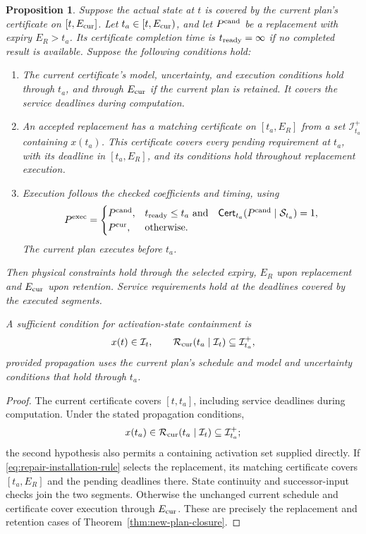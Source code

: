 \documentclass[preprint,12pt]{elsarticle}
\theoremstyle{definition}
\theoremstyle{plain}
\newtheorem{proposition}{Proposition}
\theoremstyle{definition}
\theoremstyle{plain}
\begin{document}
\begin{proposition}
\label{prop:repair-execution}
\label{prop:planned-handover}
Suppose the actual state at $t$ is covered by the current plan's
certificate on $[t,E_{\rm cur}]$. Let $t_a\in[t,E_{\rm cur})$, and let
$P^{\rm cand}$ be a replacement with expiry $E_R>t_a$. Its certificate
completion time is $t_{\rm ready}=\infty$ if no completed result is
available. Suppose the following conditions hold:
\begin{enumerate}
\item The current certificate's model, uncertainty, and execution
conditions hold through $t_a$, and through $E_{\rm cur}$ if the current
plan is retained. It covers the service deadlines during computation.
\item An accepted replacement has a matching certificate on $[t_a,E_R]$
from a set $\mathcal I_{t_a}^+$ containing $x(t_a)$. This certificate
covers every pending requirement at $t_a$, with its deadline in
$[t_a,E_R]$, and its conditions hold throughout replacement execution.
\item Execution follows the checked coefficients and timing, using
\begin{equation}
P^{\rm exec}=\begin{cases}
P^{\rm cand},&t_{\rm ready}\le t_a\ \text{and}\quad
 \mathsf{Cert}_{t_a}(P^{\rm cand}\mid\mathcal S_{t_a})=1,\\
P^{\rm cur},&\text{otherwise}.
\end{cases}
\label{eq:repair-installation-rule}
\end{equation}
The current plan executes before $t_a$.
\end{enumerate}
Then physical constraints hold through the selected expiry, $E_R$ upon
replacement and $E_{\rm cur}$ upon retention. Service requirements hold
at the deadlines covered by the executed segments.

A sufficient condition for activation-state containment is
\[
x(t)\in\mathcal I_t,\qquad
\mathcal R_{\rm cur}(t_a\mid\mathcal I_t)
 \subseteq\mathcal I_{t_a}^+,
\]
provided propagation uses the current plan's schedule and model and
uncertainty conditions that hold through $t_a$.
\end{proposition}

\begin{proof}
The current certificate covers $[t,t_a]$, including service deadlines
during computation. Under the stated propagation conditions,
\[
x(t_a)\in\mathcal R_{\rm cur}(t_a\mid\mathcal I_t)
\subseteq\mathcal I_{t_a}^+;
\]
the second hypothesis also permits a containing activation set supplied
directly. If \eqref{eq:repair-installation-rule} selects the replacement,
its matching certificate covers $[t_a,E_R]$ and the pending deadlines
there. State continuity and successor-input checks join the two segments.
Otherwise the unchanged current schedule and certificate cover execution
through $E_{\rm cur}$. These are precisely the replacement and retention
cases of Theorem~\ref{thm:new-plan-closure}.
\end{proof}
\end{document}
